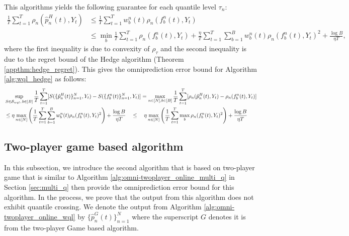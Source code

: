 This algorithms yields the following guarantee for each quantile level $\tau_n$:
\begin{align*}
\frac{1}{T}\sum_{t=1}^T \rho_n(\hat{p}_n^H(t), Y_t) 
& \leq \frac{1}{T}\sum_{t=1}^T w_b^n(t) \rho_n(f_b^n(t), Y_t)  \\
& \leq \min_b \frac{1}{T}\sum_{t=1}^T \rho_n(f_b^n(t), Y_t) + \frac{\eta}{T} \sum_{t=1}^T \sum_{b=1}^B w_{b}^n(t) \rho_n(f_b^n(t), Y_t)^2 + \frac{\log B}{\eta T},
\end{align*}
where the first inequality is due to convexity of $\rho_\tau$ and the second inequality is due to the regret bound of the Hedge algorithm (Theorem \ref{appthm:hedge_regret}). This gives the omniprediction error bound for Algorithm \ref{alg:wql_hedge} as follows:
\begin{align}
    & \sup_{S \in \mathcal{S}_{wql},\, b \in [B]} \frac{1}{T} \sum_{t=1}^T [S(\{\hat{p}_n^H(t)\}_{n=1}^N, Y_t) - S(\{f_b^n(t)\}_{n=1}^N, Y_t)] 
    = \max_{n \in [N], b \in [B]} \frac{1}{T} \sum_{t=1}^T [\rho_n(\hat{p}_n^H(t), Y_t) - \rho_n(f_b^n(t), Y_t)] \nonumber \\
    & \leq \eta \max_{n\in[N]} \left( \frac{1}{T} \sum_{t=1}^T \sum_{b=1}^B w_{b}^n(t) \rho_n(f_b^n(t), Y_t)^2\right)  + \frac{\log B}{\eta T} 
    \quad \leq \quad \eta \max_{n\in[N]} \left( \frac{1}{T} \sum_{t=1}^T \max_{b} \rho_n(f_b^n(t), Y_t)^2  \right) + \frac{\log B}{\eta T} \label{eq:hedge_wql_error_bound}
\end{align}







\subsection{Two-player game based algorithm} \label{subsec:twoplayer_wql}
In this subsection, we introduce the second algorithm that is based on two-player game that is similar to Algorithm \ref{alg:omni-twoplayer_online_multi_q} in Section \ref{sec:multi_q} then provide the omniprediction error bound for this algorithm. In the process, we prove that the output from this algorithm does not exhibit quantile crossing. We denote the output from Algorithm \ref{alg:omni-twoplayer_online_wql} by $\{\hat{p}^G_n(t)\}_{n=1}^N$ where the superscript $G$ denotes it is from the two-player Game based algorithm.


